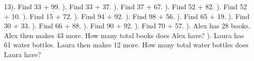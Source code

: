 \documentclass{article}%
\begin{document}
13). Find 33 + 99.%
\newline%
\newline%
). Find 33 + 37.%
\newline%
\newline%
). Find 37 + 67.%
\newline%
\newline%
). Find 52 + 82.%
\newline%
\newline%
). Find 52 + 10.%
\newline%
\newline%
). Find 15 + 72.%
\newline%
\newline%
). Find 94 + 92.%
\newline%
\newline%
). Find 98 + 56.%
\newline%
\newline%
). Find 65 + 19.%
\newline%
\newline%
). Find 30 + 33.%
\newline%
\newline%
). Find 66 + 88.%
\newline%
\newline%
). Find 90 + 92.%
\newline%
\newline%
). Find 70 + 57.%
\newline%
\newline%
). Alex has 28 books. Alex then makes 43 more. How many total books does Alex have?%
\newline%
\newline%
). Laura has 61 water bottles. Laura then makes 12 more. How many total water bottles does Laura have?%
\newline%
\end{document}
